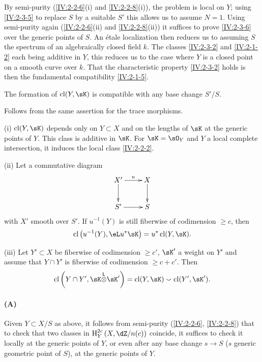 By semi-purity (\ref{IV:2-2-6}(i) and \ref{IV:2-2-8}(i)), the problem is
local on $Y$; using \ref{IV:2-3-5} to replace $S$ by a suitable $S'$
this allows us to assume $N=1$. Using semi-purity again
(\ref{IV:2-2-6}(ii) and \ref{IV:2-2-8}(ii)) it suffices to prove
\ref{IV:2-3-6} over the generic points of $S$. An \'etale localization
then reduces us to assuming $S$ the spectrum of an
algebraically closed field $k$. The classes \ref{IV:2-3-2} and \ref{IV:2-1-2} each
being additive in $Y$, this reduces us to the case where $Y$ is a closed
point on a smooth curve over $k$. That the characteristic property
\ref{IV:2-3-2} holds is then the fundamental compatibility
\ref{IV:2-1-5}.




\begin{lemma}\label{IV:2-3-7}
The formation of $\cl(Y,\sK)$ is compatible with any base change
$S'/S$.
\end{lemma}

Follows from the same assertion for the trace morphisms.




\begin{theorem}\label{IV:2-3-8}
(i) $\cl(Y,\sK)$ depends only on $Y\subset X$ and on the lengths of $\sK$ at the
generic points of $Y$. This class is additive in $\sK$. For
$\sK=\sO_Y$ and $Y$ a local complete intersection, it induces the local
class \ref{IV:2-2-2}.

(ii) Let a commutative diagram
\[\xymatrix{
  X' \ar[r]^-u \ar[d]
    & X \ar[d] \\
  S' \ar[r]
    & S
}\]
with $X'$ smooth over $S'$. If $u^{-1}(Y)$ is still fiberwise of
codimension $\geqslant c$, then
\[
  \cl\left(u^{-1}(Y),\eL u^\ast\sK\right) = u^\ast \cl(Y,\sK) \text{.}
\]

(iii) Let $Y'\subset X$ be fiberwise of codimension $\geqslant c'$,
$\sK'$ a weight on $Y'$ and assume that $Y\cap Y'$ is fiberwise of
codimension $\geqslant c+c'$. Then
\[
\cl\left(Y\cap Y',\sK\lotimes \sK'\right) = \cl(Y,\sK) \smallsmile \cl(Y',\sK') \text{.}
\]
\end{theorem}



\paragraph{(A)}
Given $Y\subset X/S$ as above, it follows from semi-purity
(\ref{IV:2-2-6}, \ref{IV:2-2-8}) that to check that two classes in
$\h_Y^{2 c}\left(X,\dZ/n(c)\right)$ coincide, it suffices to check it
locally at the generic points of $Y$, or even after any
base change $s\to S$ ($s$ generic geometric point of $S$),
at the generic points of $Y$.

